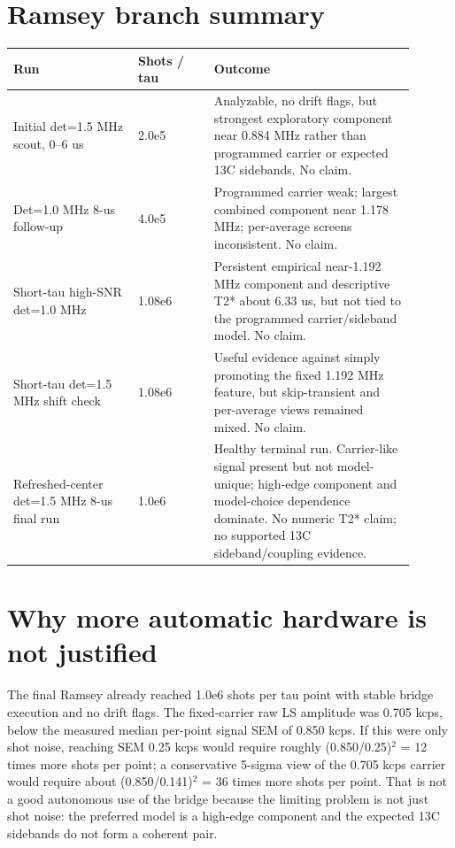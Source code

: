 \documentclass[10pt]{article}
\begin{document}
\section*{Ramsey branch summary}
\begin{tabular}{>{\raggedright\arraybackslash}p{0.28\linewidth} >{\raggedright\arraybackslash}p{0.17\linewidth} >{\raggedright\arraybackslash}p{0.45\linewidth}}
\toprule
Run & Shots / tau & Outcome \\
\midrule
Initial det=1.5 MHz scout, 0--6 us & 2.0e5 & Analyzable, no drift flags, but strongest exploratory component near 0.884 MHz rather than programmed carrier or expected 13C sidebands. No claim. \\
Det=1.0 MHz 8-us follow-up & 4.0e5 & Programmed carrier weak; largest combined component near 1.178 MHz; per-average screens inconsistent. No claim. \\
Short-tau high-SNR det=1.0 MHz & 1.08e6 & Persistent empirical near-1.192 MHz component and descriptive T2* about 6.33 us, but not tied to the programmed carrier/sideband model. No claim. \\
Short-tau det=1.5 MHz shift check & 1.08e6 & Useful evidence against simply promoting the fixed 1.192 MHz feature, but skip-transient and per-average views remained mixed. No claim. \\
Refreshed-center det=1.5 MHz 8-us final run & 1.0e6 & Healthy terminal run. Carrier-like signal present but not model-unique; high-edge component and model-choice dependence dominate. No numeric T2* claim; no supported 13C sideband/coupling evidence. \\
\bottomrule
\end{tabular}

\section*{Why more automatic hardware is not justified}
The final Ramsey already reached 1.0e6 shots per tau point with stable bridge execution and no drift flags. The fixed-carrier raw LS amplitude was 0.705 kcps, below the measured median per-point signal SEM of 0.850 kcps. If this were only shot noise, reaching SEM 0.25 kcps would require roughly (0.850/0.25)$^2$ = 12 times more shots per point; a conservative 5-sigma view of the 0.705 kcps carrier would require about (0.850/0.141)$^2$ = 36 times more shots per point. That is not a good autonomous use of the bridge because the limiting problem is not just shot noise: the preferred model is a high-edge component and the expected 13C sidebands do not form a coherent pair.
\end{document}
